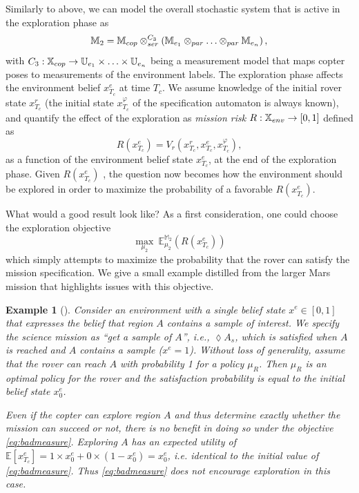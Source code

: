 \documentclass[conference]{IEEEtran}
\newtheorem{example}{Example}
\begin{document}
Similarly to above, we can model the overall stochastic system that is active in the exploration phase as
\begin{equation}
\label{eq:copt-env-rpod}
	\MDP_2 = \MDP_{cop} \otimes_{ser}^{C_3} \left( \MDP_{e_1} \otimes_{par} \ldots \otimes_{par} \MDP_{e_n} \right),
\end{equation}
with $C_3 : \mathbb{X}_{cop} \rightarrow \mathbb{U}_{e_1} \times \ldots \times \mathbb{U}_{e_n}$ being a measurement model that maps copter poses to measurements of the environment labels. The exploration phase affects the environment belief $x^e_{T_c}$ at time $T_c$. We assume knowledge of the initial rover state $x_{T_c}^r$ (the initial state $x_{T_c}^\varphi$ of the specification automaton is always known), and quantify the effect of the exploration as \emph{mission risk} $R:\mathbb{X}_{env}\rightarrow [0,1]$ defined as
\begin{equation}
	R(x_{T_c}^e) = V_r(x_{T_c}^r, x_{T_c}^e, x_{T_c}^\varphi),
\end{equation}
as a function of the environment belief state $x^e_{T_c}$, at the end of the exploration phase. Given $R(x_{T_c}^e)$%
, the question now becomes how the environment should be explored in order to maximize the probability of a favorable $R(x_{T_c}^e)$.

What would a good result look like? As a first consideration, one could choose the exploration objective
\begin{equation}
\label{eq:badmeasure}
	\max_{\mu_{2}}\  \mathbb E^{\mathbb M_{2}}_{\mu_2} (R(x_{T_c}^e) )
\end{equation}
which simply attempts to maximize the probability that the rover can satisfy the mission specification. We give a small example distilled from the larger Mars mission that highlights issues with this objective.

\begin{example}[]
	Consider an environment with a single belief state $x^e\in[0,1]$ that expresses the belief that region $A$ contains a sample of interest. We specify the science mission as ``\emph{get a sample of $A$}'', i.e.,  $\lozenge A_s$, which is satisfied when $A$ is reached and $A$ contains a sample ($x^e = 1$). Without loss of generality, assume that the rover can reach $A$ with probability 1 for a policy $\mu_R$. Then $\mu_R$ is an optimal policy for the rover and the satisfaction probability is equal to the initial belief state $x^e_{0}$.

	Even if the copter can explore region $A$ and thus determine exactly whether the mission can succeed or not, there is no benefit in doing so under the objective \eqref{eq:badmeasure}. Exploring $A$ has an expected utility of $\mathbb{E} \left[ x_{T_c}^e \right] = 1\times x^e_{0} +  0\times (1- x^e_{0}) = x^e_0$, i.e. identical to the initial value of \eqref{eq:badmeasure}. Thus \eqref{eq:badmeasure} does not encourage exploration in this case.
\end{example}
\end{document}
